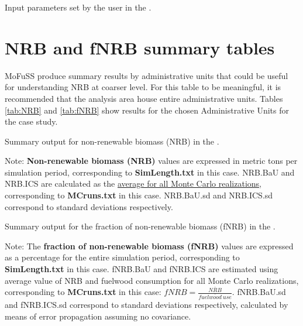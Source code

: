 \documentclass[english,a4paper,11pt,twoside]{report}
\begin{document}
\begin{table}[H]
	\centering
	\caption{Input parameters set by the user in the .}
	\label{tab:Input Par}
\end{table}

\pagebreak
\section{NRB and fNRB summary tables} \label{sec:NRB}
MoFuSS produce summary results by administrative units that could be useful for understanding NRB at coarser level. For this table to be meaningful, it is recommended that the analysis area house entire administrative units. 
Tables \ref{tab:NRB} and \ref{tab:fNRB} show results for the chosen Administrative Units for the  case study.

\begin{table}[H]
	\centering
	\caption{Summary output for non-renewable biomass (NRB) in the .}
	\large 
	\label{tab:NRB}
	\begin{flushleft}
	{\small Note: \textbf{Non-renewable biomass (NRB)} values are expressed in metric tons per simulation period, corresponding to \textbf{ {SimLength.txt}} in this case. NRB.BaU and NRB.ICS are calculated as the \underline{average for all Monte Carlo realizations}, corresponding to \textbf{ {MCruns.txt}} in this case. NRB.BaU.sd and NRB.ICS.sd correspond to standard deviations respectively.%
	}
	\end{flushleft}
\end{table}
\begin{table}[H]
	\centering
	\caption{Summary output for the fraction of non-renewable biomass (fNRB) in the  .}
	\large
	\label{tab:fNRB}
	\csvautotabular{fNRBTable.csv}
	\begin{flushleft}
	{\small Note: The \textbf{fraction of non-renewable biomass (fNRB)} values are expressed as a percentage for the entire simulation period, corresponding to \textbf{ {SimLength.txt}} in this case. fNRB.BaU and fNRB.ICS are estimated using average value of NRB and fuelwood consumption for all Monte Carlo realizations, corresponding to \textbf{ {MCruns.txt}} in this case: $ fNRB=\frac{\bar{NRB}}{\bar{fuelwood\:use}} $. fNRB.BaU.sd and fNRB.ICS.sd correspond to standard deviations respectively, calculated by means of error propagation assuming no covariance.%
	}
	\end{flushleft}
	\end{table}
\bigskip
\bigskip
\bigskip
\bigskip
\bigskip
\bigskip
\bigskip
\bigskip
\end{document}
